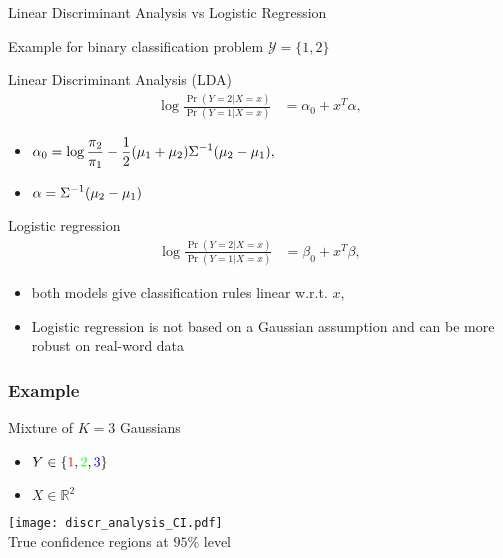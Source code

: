 \documentclass[compress, smaller, serif, 9pt]{beamer}
\begin{document}
\begin{frame}{Linear Discriminant Analysis vs Logistic Regression}

Example for binary classification problem $\mathcal{Y}=\{1,2\}$
\begin{block}{Linear Discriminant Analysis (LDA)}
\vspace{-3mm}
\begin{align*}
\log \frac{\Pr(Y=2 | X=x)}{\Pr(Y=1 | X=x)} &= \alpha_0 + x^T \alpha, 
\end{align*}\vspace{-3mm}
\begin{itemize}
 \item $\begin{displaystyle}
         \alpha_0= \log \frac{\pi_2}{\pi_1} - \frac{1}{2} (\mu_1+  \mu_2) \Sigma^{-1}(\mu_2 -  \mu_1),    
        \end{displaystyle}$
 \item $\begin{displaystyle} \alpha=  \Sigma^{-1} (\mu_2 -  \mu_1) \end{displaystyle}$
\end{itemize}

\end{block}

\begin{block}{Logistic regression}\vspace{-5mm}
\begin{align*}
\log \frac{\Pr(Y=2 | X=x)}{\Pr(Y=1 | X=x)} &= \beta_0 + x^T \beta, 
\end{align*}
\end{block}

\begin{itemize}
 \item both models give classification rules linear w.r.t. $x$,
 \item Logistic regression is not based on a Gaussian assumption and can be more robust on real-word data
\end{itemize}


\end{frame}


\begin{frame}
  \frametitle{Example}
\begin{block}{Mixture of $K=3$ Gaussians}
\begin{itemize}
   \item $Y \in \{\textcolor{red}{1},\textcolor{green}{2},\textcolor{blue}{3}\}$
   \item $X \in \mathbb{R}^2$
\end{itemize}
\end{block}
\vspace*{-8mm}

\begin{center}
  \texttt{[image: discr\_analysis\_CI.pdf]} \\
  True confidence regions at $95\%$ level
\end{center}

\end{frame}
\end{document}
